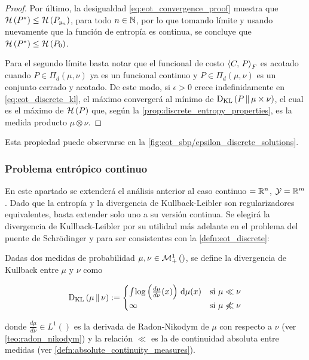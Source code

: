 \begin{proof}
	Por último, la desigualdad \eqref{eq:eot_convergence_proof} muestra que $\mathcal{H}\left(P^*\right)\leq\mathcal{H}\left(P_{y_n}\right)$, para todo $n\in\mathbb{N}$, por lo que tomando límite y usando nuevamente que la función de entropía es continua, se concluye que $\mathcal{H}\left(P^*\right)\leq\mathcal{H}\left(P_0\right)$.

	Para el segundo límite basta notar que el funcional de costo $\left\langle C,\,P\right\rangle_F$ es acotado cuando $P\in\Pi_d(\mu,\nu)$ ya es un funcional continuo y $P\in\Pi_d(\mu,\nu)$ es un conjunto cerrado y acotado. De este modo, si $\epsilon>0$ crece indefinidamente en \eqref{eq:eot_discrete_kl}, el máximo convergerá al mínimo de $\operatorname{D_{KL}}\left(P\,\|\,\mu\times\nu\right)$, el cual es el máximo de $\mathcal{H}\left(P\right)$ que, según la \autoref{prop:discrete_entropy_properties}, es la medida producto $\mu\otimes\nu$.
\end{proof}

Esta propiedad puede observarse en la \autoref{fig:eot_sbp/epsilon_discrete_solutions}.


\subsubsection{Problema entrópico continuo}

En este apartado se extenderá el análisis anterior al caso continuo $=\mathbb{R}^n$, $\mathcal{Y}=\mathbb{R}^m$. Dado que la entropía y la divergencia de Kullback-Leibler son regularizadores equivalentes, basta extender solo uno a su versión continua. Se elegirá la divergencia de Kullback-Leibler por su utilidad más adelante en el problema del puente de Schrödinger y para ser consistentes con la \autoref{defn:eot_discrete}:

\begin{defn}
	\label{defn:kl}
	Dadas dos medidas de probabilidad $\mu,\nu\in\mathcal{M}_+^1\left(\right)$, se define la divergencia de Kullback entre $\mu$ y $\nu$ como

	\begin{equation*}
		\operatorname{D_{KL}}\left(\mu\,\|\,\nu\right) :=
		\begin{cases}
			\int_{} \log\left(\frac{d\mu}{d\nu}(x)\right) \,\operatorname{d}\! \mu(x) & \text{si } \mu\ll\nu       \\
			\infty                                                     & \text{si } \mu \not\ll \nu
		\end{cases}
	\end{equation*}

	donde $\frac{d\mu}{d\nu}\in L^1(\xspace)$ es la derivada de Radon-Nikodym de $\mu$ con respecto a $\nu$ (ver \autoref{teo:radon_nikodym}) y la relación $\ll$ es la de continuidad absoluta entre medidas (ver \autoref{defn:absolute_continuity_measures}).
\end{defn}

